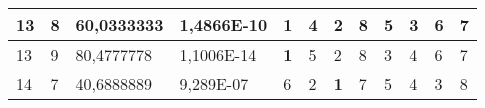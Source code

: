 \documentclass[conference]{IEEEtran}
\begin{document}
\begin{table*}[]
\begin{tabular}{|llll|llllllll|}
\multicolumn{1}{|l|}{13}                                                    & \multicolumn{1}{l|}{8}                                                        & \multicolumn{1}{l|}{60,0333333}                                                   & 1,4866E-10                     & \multicolumn{1}{l|}{\textbf{1}}                                         & \multicolumn{1}{l|}{4}                                                  & \multicolumn{1}{l|}{2}                                                  & \multicolumn{1}{l|}{8}                                                  & \multicolumn{1}{l|}{5}                                                  & \multicolumn{1}{l|}{3}                                                  & \multicolumn{1}{l|}{6}                                                  & 7                          \\ \hline
\multicolumn{1}{|l|}{13}                                                    & \multicolumn{1}{l|}{9}                                                        & \multicolumn{1}{l|}{80,4777778}                                                   & 1,1006E-14                     & \multicolumn{1}{l|}{\textbf{1}}                                         & \multicolumn{1}{l|}{5}                                                  & \multicolumn{1}{l|}{2}                                                  & \multicolumn{1}{l|}{8}                                                  & \multicolumn{1}{l|}{3}                                                  & \multicolumn{1}{l|}{4}                                                  & \multicolumn{1}{l|}{6}                                                  & 7                          \\ \hline
\multicolumn{1}{|l|}{14}                                                    & \multicolumn{1}{l|}{7}                                                        & \multicolumn{1}{l|}{40,6888889}                                                   & 9,289E-07                      & \multicolumn{1}{l|}{6}                                                  & \multicolumn{1}{l|}{2}                                                  & \multicolumn{1}{l|}{\textbf{1}}                                         & \multicolumn{1}{l|}{7}                                                  & \multicolumn{1}{l|}{5}                                                  & \multicolumn{1}{l|}{4}                                                  & \multicolumn{1}{l|}{3}                                                  & 8                          \\ \hline

\end{tabular}
\end{table*}
\end{document}
